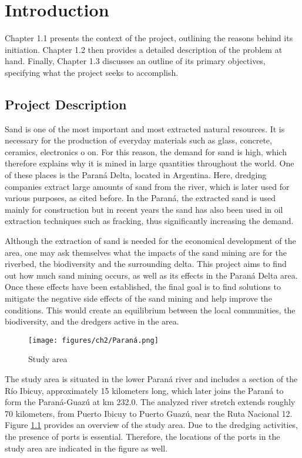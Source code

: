 \chapter{Introduction}
\label{chapter:introduction}

Chapter 1.1 presents the context of the project, outlining the reasons behind its initiation. Chapter 1.2 then provides a detailed description of the problem at hand. Finally, Chapter 1.3 discusses an outline of its primary objectives, specifying what the project seeks to accomplish.

\section{Project Description}
Sand is one of the most important and most extracted natural resources. It is necessary for the production of everyday materials such as glass, concrete, ceramics, electronics o on. For this reason, the demand for sand is high, which therefore explains why it is mined in large quantities throughout the world. One of these places is the Paraná Delta, located in Argentina. Here, dredging companies extract large amounts of sand from the river, which is later used for various purposes, as cited before. In the Paraná, the extracted sand is used mainly for construction but in recent years the sand has also been used in oil extraction techniques such as fracking, thus significantly increasing the demand. 


Although the extraction of sand is needed for the economical development of the area, one may ask themselves what the impacts of the sand mining are for the riverbed, the biodiversity and the surrounding delta. This project aims to find out how much sand mining occurs, as well as its effects in the Paraná Delta area. Once these effects have been established, the final goal is to find solutions to mitigate the negative side effects of the sand mining and help improve the conditions. This would create an equilibrium between the local communities, the biodiversity, and the dredgers active in the area.

\begin{figure}[H]
    \centering    \texttt{[image: figures/ch2/Paraná.png]}
    \caption{Study area}
    \label{fig:study area}
\end{figure}
\label{Figure 1.1}

The study area is situated in the lower Paraná river and includes a section of the Río Ibicuy, approximately 15 kilometers long, which later joins the Paraná to form the Paraná-Guazú at km 232.0. The analyzed river stretch extends roughly 70 kilometers, from Puerto Ibicuy to Puerto Guazú, near the Ruta Nacional 12. Figure \ref{fig:study area} provides an overview of the study area. Due to the dredging activities, the presence of ports is essential. Therefore, the locations of the ports in the study area are indicated in the figure as well. 

